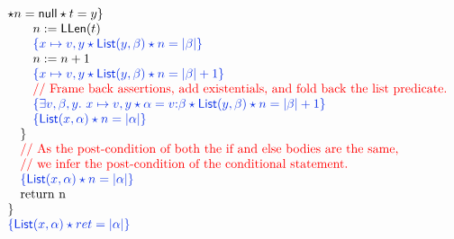 \documentclass[11pt]{article}
\newcommand{\List}{\mathsf{List}}
\newcommand{\LLen}{\mathsf{LLen}}
\newcommand{\Null}{\mathsf{null}}
\newcommand{\blueassn}[1]{\textcolor{blue}{#1}}
\begin{document}
{\[\begin{array}{@{}l@{}}
{  \star n = \Null \star t = y\}} \\
\qquad n := \LLen(t) \\
\qquad \blueassn{\{x \mapsto v,y \star \List(y,\beta) \star n = |\beta|\}} \\
\qquad n := n + 1 \\
\qquad \blueassn{\{x \mapsto v,y \star \List(y,\beta)
  \star n = |\beta| + 1\}} \\
\qquad \text{\textcolor{red}{// Frame back assertions, add existentials, and fold back the list predicate.}} \\
\qquad \blueassn{\{\exists v,\beta,y.\ x \mapsto v,y
  \star \alpha = v{:}\beta \star \List(y,\beta) \star n = |\beta| + 1\}} \\
\qquad \blueassn{\{\List(x,\alpha) \star n = |\alpha|\}} \\
\quad \} \\
\quad \text{\textcolor{red}{// As the post-condition of both the if and else bodies are the same,}} \\
\quad \text{\textcolor{red}{// we infer the post-condition of the conditional statement.}} \\
\quad \blueassn{\{\List(x,\alpha) \star n = |\alpha|\}} \\
\quad \text{return n}\\
\}\\
\blueassn{\{\List(x,\alpha) \star ret = |\alpha|\}} \\
\end{array}
\]
}
\end{document}

